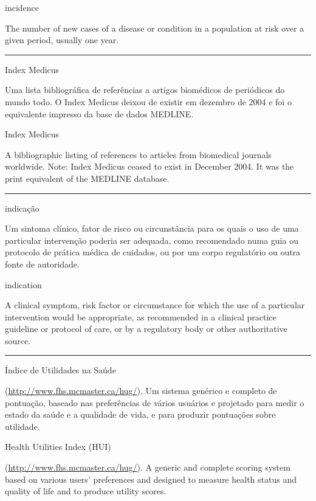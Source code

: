 \documentclass[
  openany]{book}
\begin{document}
incidence

The number of new cases of a disease or condition in a population at risk over a given period, usually one year.

\begin{center}\rule{0.5\linewidth}{0.5pt}\end{center}

Index Medicus

Uma lista bibliográfica de referências a artigos biomédicos de periódicos do mundo todo. O Index Medicus deixou de existir em dezembro de 2004 e foi o equivalente impresso da base de dados MEDLINE.

Index Medicus

A bibliographic listing of references to articles from biomedical journals worldwide. Note: Index Medicus ceased to exist in December 2004. It was the print equivalent of the MEDLINE database.

\begin{center}\rule{0.5\linewidth}{0.5pt}\end{center}

indicação

Um sintoma clínico, fator de risco ou circunstância para os quais o uso de uma particular intervenção poderia ser adequada, como recomendado numa guia ou protocolo de prática médica de cuidados, ou por um corpo regulatório ou outra fonte de autoridade.

indication

A clinical symptom, risk factor or circumstance for which the use of a particular intervention would be appropriate, as recommended in a clinical practice guideline or protocol of care, or by a regulatory body or other authoritative source.

\begin{center}\rule{0.5\linewidth}{0.5pt}\end{center}

Índice de Utilidades na Saúde

(\url{http://www.fhs.mcmaster.ca/hug/}). Um sistema genérico e completo de pontuação, baseado nas preferências de vários usuários e projetado para medir o estado da saúde e a qualidade de vida, e para produzir pontuações sobre utilidade.

Health Utilities Index (HUI)

(\url{http://www.fhs.mcmaster.ca/hug/}). A generic and complete scoring system based on various users' preferences and designed to measure health status and quality of life and to produce utility scores.
\end{document}
